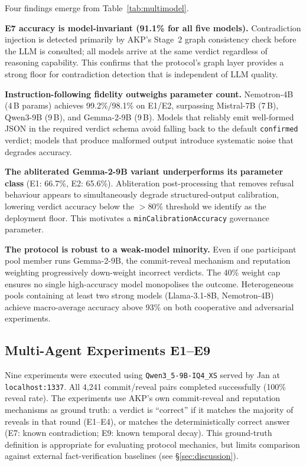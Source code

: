\documentclass[10pt,twocolumn]{article}
\begin{document}
Four findings emerge from Table~\ref{tab:multimodel}.

\textbf{E7 accuracy is model-invariant (91.1\% for all five models).}
Contradiction injection is detected primarily by AKP's Stage~2 graph
consistency check before the LLM is consulted; all models arrive at the
same verdict regardless of reasoning capability. This confirms that the
protocol's graph layer provides a strong floor for contradiction
detection that is independent of LLM quality.

\textbf{Instruction-following fidelity outweighs parameter count.}
Nemotron-4B (4\,B params) achieves 99.2\%/98.1\% on E1/E2, surpassing
Mistral-7B (7\,B), Qwen3-9B (9\,B), and Gemma-2-9B (9\,B). Models that
reliably emit well-formed JSON in the required verdict schema avoid
falling back to the default \texttt{confirmed} verdict; models that
produce malformed output introduce systematic noise that degrades accuracy.

\textbf{The abliterated Gemma-2-9B variant underperforms its parameter
class} (E1: 66.7\%, E2: 65.6\%). Abliteration post-processing that removes
refusal behaviour appears to simultaneously degrade structured-output
calibration, lowering verdict accuracy below the $>80\%$ threshold we
identify as the deployment floor. This motivates a
\texttt{minCalibrationAccuracy} governance parameter.

\textbf{The protocol is robust to a weak-model minority.}
Even if one participant pool member runs Gemma-2-9B, the commit-reveal
mechanism and reputation weighting progressively down-weight incorrect
verdicts. The 40\% weight cap ensures no single high-accuracy model
monopolises the outcome. Heterogeneous pools containing at least two
strong models (Llama-3.1-8B, Nemotron-4B) achieve macro-average accuracy
above 93\% on both cooperative and adversarial experiments.

\subsection{Multi-Agent Experiments E1–E9}

Nine experiments were executed using \texttt{Qwen3\_5-9B-IQ4\_XS} served
by Jan at \texttt{localhost:1337}. All 4,241 commit/reveal pairs completed
successfully (100\% reveal rate). The experiments use AKP's own commit-reveal
and reputation mechanisms as ground truth: a verdict is ``correct'' if it
matches the majority of reveals in that round (E1–E4), or matches the
deterministically correct answer (E7: known contradiction; E9: known
temporal decay). This ground-truth definition is appropriate for evaluating
protocol mechanics, but limits comparison against external fact-verification
baselines (see §\ref{sec:discussion}).
\end{document}
